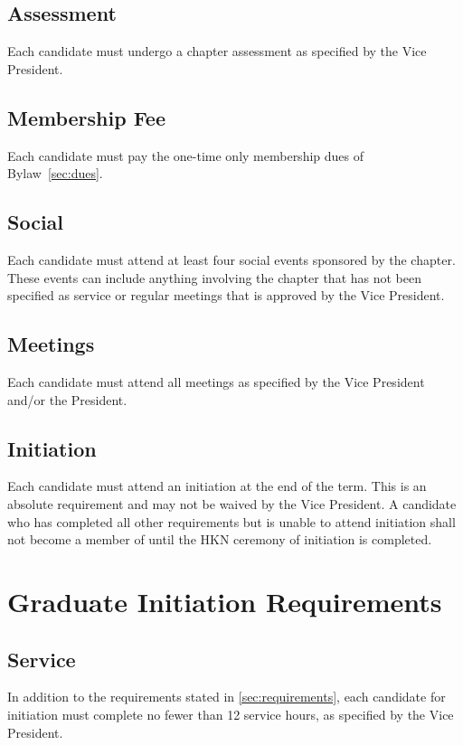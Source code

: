 \section{Assessment}
Each candidate must undergo a chapter assessment as specified by the Vice President.

\section{Membership Fee}
Each candidate must pay the one-time only membership dues of Bylaw~\ref{sec:dues}.

\section{Social}
Each candidate must attend at least four social events sponsored by the chapter. These events can include anything involving the chapter that has not been specified as service or regular meetings that is approved by the Vice President.

\section{Meetings}
Each candidate must attend all meetings as specified by the Vice President and/or the President.

\section{Initiation}
Each candidate must attend an \hkn initiation at the end of the term. This is an absolute requirement and may not be waived by the Vice President.  A candidate who has completed all other requirements but is unable to attend initiation shall not become a member of \hkn until the HKN ceremony of initiation is completed.

\chapter{Graduate Initiation Requirements}\label{app:gradreqs}

\section{Service}
In addition to the requirements stated in \ref{sec:requirements}, each candidate for initiation must complete no fewer than 12 service hours, as specified by the Vice President.


